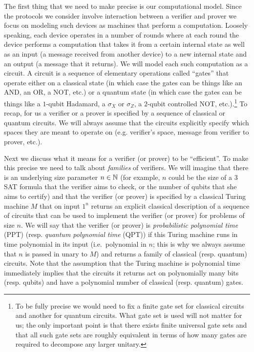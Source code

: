 The first thing that we need to make precise is our computational model. Since the protocols we consider involve interaction between a verifier and prover we focus on modeling such devices as machines that perform a computation. Loosely speaking, each device operates in a number of rounds where at each round the device performs a computation that takes it from a certain internal state as well as an input (a message received from another device) to a new internal state and an output (a message that it returns). We will model each such computation as a circuit. A circuit is a sequence of elementary operations called ``gates'' that operate either on a classical state (in which case the gates can be things like an AND, an OR, a NOT, etc.) or a quantum state (in which case the gates can be things like a $1$-qubit Hadamard, a $\sigma_X$ or $\sigma_Z$, a $2$-qubit controlled NOT, etc.).\footnote{To be fully precise we would need to fix a finite gate set for classical circuits and another for quantum circuits. What gate set is used will not matter for us; the only important point is that there exists finite universal gate sets and that all such gate sets are roughly equivalent in terms of how many gates are required to decompose any larger unitary.} To recap, for us a verifier or a prover is specified by a sequence of classical or quantum circuits. We will always assume that the circuits explicitly specify which spaces they are meant to operate on (e.g. verifier's space, message from verifier to prover, etc.). 

Next we discuss what it means for a verifier (or prover) to be ``efficient''. To make this precise we need to talk about \emph{families} of verifiers. We will imagine that there is an underlying size parameter $n\in \mathbb{N}$ (for example, $n$ could be the size of a $3$SAT formula that the verifier aims to check, or the number of qubits that she aims to certify) and that the verifier (or prover) is specified by a classical Turing machine $M$ that on input $1^n$ returns an explicit classical description of a sequence of circuits that can be used to implement the verifier (or prover) for problems of size $n$. We will say that the verifier (or prover) is \emph{probabilistic polynomial time} (PPT) (resp. \emph{quantum polynomial time} (QPT)) if this Turing machine runs in time polynomial in its input (i.e.\ polynomial in $n$; this is why we always assume that $n$ is passed in unary to $M$) and returns a family of classical (resp. quantum) circuits. Note that the assumption that the Turing machine is polynomial time immediately implies that the circuits it returns act on polynomially many bits (resp. qubits) and have a polynomial number of classical (resp. quantum) gates. 


